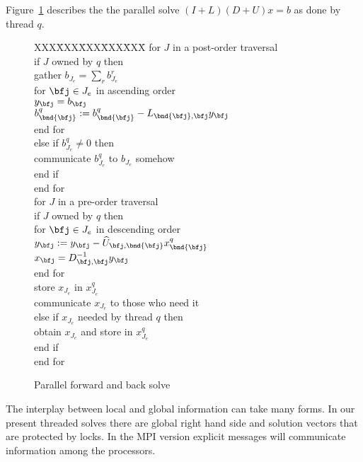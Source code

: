 \par
Figure~\ref{fig:parallel-solve} describes the
the parallel solve $(I+L)(D+U)x = b$ as done by thread $q$.
\begin{figure}
\caption{Parallel forward and back solve}
\label{fig:parallel-solve}
\begin{center}
\begin{minipage}{3.5 in}
\begin{tabbing}
XXX\=XXX\=XXX\=XXX\=XXX\=\kill
for $J$ in a post-order traversal \\
\> if  $J$ owned by $q$ then \\
\>\> gather $b_{J_e} = \sum_r b_{J_e}^r$ \\
\>\> for $\bfj \in J_e$ in ascending order \\
\>\>\> $y_{\bfj} = b_{\bfj}$ \\
\>\>\> $b^q_{\bnd{\bfj}} :=
      b^q_{\bnd{\bfj}} - L_{\bnd{\bfj},\bfj} y_{\bfj}$ \\
\>\> end for\\
\> else if $b_{J_e}^q \ne 0$ then \\
\>\> communicate $b_{J_e}^q$ to $b_{J_e}$ somehow \\
\> end if\\
end for\\
for $J$ in a pre-order traversal \\
\> if  $J$ owned by $q$ then \\
\>\> for $\bfj \in J_e$ in descending order \\
\>\>\> $y_{\bfj} := y_{\bfj} 
        - {\widehat U}_{\bfj,\bnd{\bfj}} x^q_{\bnd{\bfj}}$ \\
\>\>\> $x_{\bfj} = D_{\bfj,\bfj}^{-1} y_{\bfj}$ \\
\>\> end for\\
\>\> store $x_{J_e}$ in $x^q_{J_e}$ \\
\>\> communicate $x_{J_e}$ to those who need it \\
\> else if $x_{J_e}$ needed by thread $q$ then \\
\>\> obtain $x_{J_e}$ and store in $x^q_{J_e}$ \\
\> end if \\
end for
\end{tabbing}
\end{minipage}
\end{center}
\end{figure}
\par
The interplay between local and global information can take many
forms.
In our present threaded solves there are global right hand side and
solution vectors that are protected by locks.
In the MPI version explicit messages will communicate information
among the processors.
